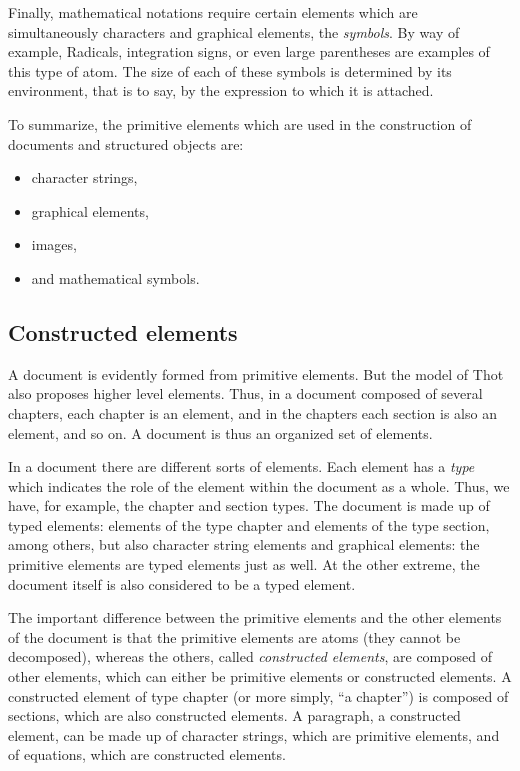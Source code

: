 Finally, mathematical notations require certain elements which are
simultaneously characters and graphical elements, the {\em symbols}.
By way of example, Radicals, integration signs, or even large
parentheses are examples of this type of atom.  The size of each of
these symbols is determined by its environment, that is to say, by the
expression to which it is attached.

To summarize, the primitive elements which are used in the
construction of documents and structured objects are:
\begin{itemize}
  \item character strings,
  \item graphical elements,
  \item images,
  \item and mathematical symbols.
\end{itemize}

\subsection{Constructed elements}

A document is evidently formed from primitive elements.  But the model
of Thot also proposes higher level elements.  Thus, in a document
composed of several chapters, each chapter is an element, and in the
chapters each section is also an element, and so on.  A document is
thus an organized set of elements.

In a document there are different sorts of elements.  Each element has
a {\em type} which indicates the role of the element within the
document as a whole.  Thus, we have, for example, the chapter and
section types.  The document is made up of typed elements: elements of
the type chapter and elements of the type section, among others, but
also character string elements  and graphical elements: the primitive
elements are typed elements just as well.  At the other extreme, the
document itself is also considered to be a typed element.

The important difference between the primitive elements and the other
elements of the document is that the primitive elements are atoms
(they cannot be decomposed), whereas the others, called {\em
constructed elements}, are composed of other elements, which can
either be primitive elements or constructed elements.  A constructed
element of type chapter (or more simply, ``a chapter'') is composed
of sections, which are also constructed elements.  A paragraph, a
constructed element, can be made up of character strings, which are
primitive elements, and of equations, which are constructed elements.

